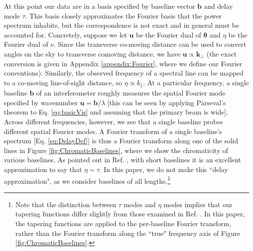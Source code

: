 \documentclass[twocolumn,aps,prd,nofootinbib,showpacs]{revtex4-1}
\begin{document}
At this point our data are in a basis specified by baseline vector $\mathbf{b}$ and delay mode $\tau$.  This basis closely approximates the Fourier basis that the power spectrum inhabits, but the correspondence is not exact and in general must be accounted for.  Concretely, suppose we let $\mathbf{u}$ be the Fourier dual of $\boldsymbol \theta$ and $\eta$ be the Fourier dual of $\nu$.  Since the transverse co-moving distance can be used to convert angles on the sky to transverse comoving distance, we have $\mathbf{u} \propto \mathbf{k}_\perp$ (the exact conversion is given in Appendix \ref{appendix:Fourier}, where we define our Fourier conventions).  Similarly, the observed frequency of a spectral line can be mapped to a co-moving line-of-sight distance, so $\eta \propto k_\parallel$.  At a particular frequency, a single baseline $\mathbf{b}$ of an interferometer roughly measures the spatial Fourier mode specified by wavenumber $\mathbf{u} = \mathbf{b} / \lambda$ [this can be seen by applying Parseval's theorem to Eq. \eqref{eq:basicVis} and assuming that the primary beam is wide].  Across different frequencies, however, we see that a single baseline probes different spatial Fourier modes.  A Fourier transform of a single baseline's spectrum [Eq. \eqref{eq:DelayDef}] is thus a Fourier transform along one of the solid lines in Figure \ref{fig:ChromaticBaselines}, where we show the chromaticity of various baselines.  As pointed out in Ref. \cite{Parsons2012b}, with short baselines it is an excellent approximation to say that $\eta \sim \tau$.  In this paper, we do not make this ``delay approximation", as we consider baselines of all lengths.\footnote{Note that the distinction between $\tau$ modes and $\eta$ modes implies that our tapering functions differ slightly from those examined in Ref. \cite{Thyagarajan2013}.  In this paper, the tapering functions are applied to the per-baseline Fourier transform, rather than the Fourier transform along the ``true" frequency axis of Figure \ref{fig:ChromaticBaselines}.}
\end{document}
